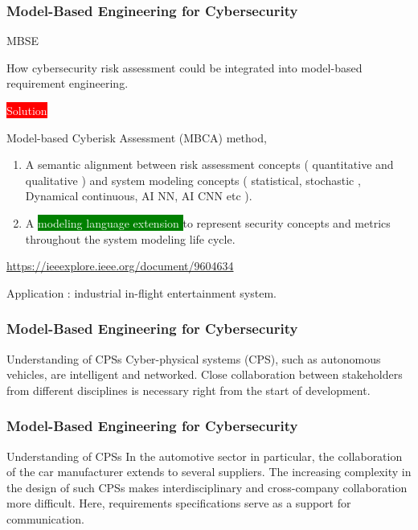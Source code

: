 \begin{frame}
\frametitle{Model-Based Engineering for Cybersecurity}

\begin{block}{MBSE }


 How cybersecurity risk assessment could be integrated into model-based requirement engineering. 


\colorbox{red}{ \textcolor{white}{ Solution } }

Model-based Cyberisk Assessment (MBCA) method, 

\begin{enumerate}
    \item  A semantic alignment between risk assessment concepts ( quantitative and qualitative ) and system modeling concepts ( statistical, stochastic , Dynamical continuous,  AI NN, AI CNN etc ).
    \item A \colorbox{green}{ \textcolor{white}{  modeling language extension } } to represent security concepts and metrics throughout the system modeling life cycle.
\end{enumerate}

\url{https://ieeexplore.ieee.org/document/9604634}

 Application :  industrial in-flight entertainment system.
 
\end{block}
\end{frame}


\newpage 

\begin{frame}
\frametitle{Model-Based Engineering for Cybersecurity}

\begin{block}{Understanding of CPSs  }
Cyber-physical systems (CPS), such as autonomous vehicles, are intelligent and networked. Close collaboration between stakeholders from different disciplines is necessary right from the start of development. 
\end{block}
\end{frame}


\newpage 

\begin{frame}
\frametitle{Model-Based Engineering for Cybersecurity}

\begin{block}{Understanding of CPSs  }
 In the automotive sector in particular, the collaboration of the car manufacturer extends to several suppliers. The increasing complexity in the design of such CPSs makes interdisciplinary and cross-company collaboration more difficult. Here, requirements specifications serve as a support for communication. 
\end{block}
\end{frame}

